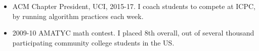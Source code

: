 \documentclass[a4paper,10pt]{article} %
\begin{document}
\begin{itemize}
\item ACM Chapter President, UCI, 2015-17. I coach students to compete at ICPC, by running algorithm practices each week.
\item 2009-10 AMATYC math contest. I placed 8th overall, out of several thousand participating community college students in the US.
\end{itemize}


%
%
\end{document}
